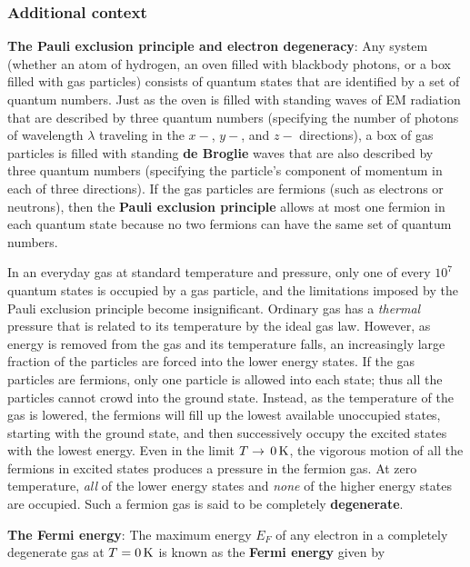 \documentclass[a4paper,10pt]{article}
\begin{document}
\subsubsection{Additional context}

{\noindent}\textbf{The Pauli exclusion principle and electron degeneracy}: Any system (whether an atom of hydrogen, an oven filled with blackbody photons, or a box filled with gas particles) consists of quantum states that are identified by a set of quantum numbers. Just as the oven is filled with standing waves of EM radiation that are described by three quantum numbers (specifying the number of photons of wavelength $\lambda$ traveling in the $x-$, $y-$, and $z-$ directions), a box of gas particles is filled with standing \textbf{de Broglie} waves that are also described by three quantum numbers (specifying the particle's component of momentum in each of three directions). If the gas particles are fermions (such as electrons or neutrons), then the \textbf{Pauli exclusion principle} allows at most one fermion in each quantum state because no two fermions can have the same set of quantum numbers.

{\noindent}In an everyday gas at standard temperature and pressure, only one of every $10^7$ quantum states is occupied by a gas particle, and the limitations imposed by the Pauli exclusion principle become insignificant. Ordinary gas has a \textit{thermal} pressure that is related to its temperature by the ideal gas law. However, as energy is removed from the gas and its temperature falls, an increasingly large fraction of the particles are forced into the lower energy states. If the gas particles are fermions, only one particle is allowed into each state; thus all the particles cannot crowd into the ground state. Instead, as the temperature of the gas is lowered, the fermions will fill up the lowest available unoccupied states, starting with the ground state, and then successively occupy the excited states with the lowest energy. Even in the limit $T\rightarrow\,0\,{\rm K}$, the vigorous motion of all the fermions in excited states produces a pressure in the fermion gas. At zero temperature, \textit{all} of the lower energy states and \textit{none} of the higher energy states are occupied. Such a fermion gas is said to be completely \textbf{degenerate}.

{\noindent}\textbf{The Fermi energy}: The maximum energy $E_F$ of any electron in a completely degenerate gas at $T=0\,{\rm K}$ is known as the \textbf{Fermi energy} given by
\end{document}
